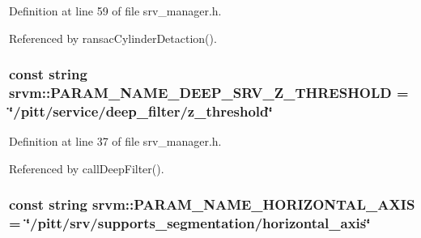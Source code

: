 Definition at line 59 of file srv\-\_\-manager.\-h.



Referenced by ransac\-Cylinder\-Detaction().

\hypertarget{namespacesrvm_af5f0c98fe811a1ad130ec625e9b2cf75}{
\subsubsection[{P\-A\-R\-A\-M\-\_\-\-N\-A\-M\-E\-\_\-\-D\-E\-E\-P\-\_\-\-S\-R\-V\-\_\-\-Z\-\_\-\-T\-H\-R\-E\-S\-H\-O\-L\-D}]{\setlength{\rightskip}{0pt plus 5cm}const string srvm\-::\-P\-A\-R\-A\-M\-\_\-\-N\-A\-M\-E\-\_\-\-D\-E\-E\-P\-\_\-\-S\-R\-V\-\_\-\-Z\-\_\-\-T\-H\-R\-E\-S\-H\-O\-L\-D = \char`\"{}/pitt/service/deep\-\_\-filter/z\-\_\-threshold\char`\"{}}}\label{namespacesrvm_af5f0c98fe811a1ad130ec625e9b2cf75}


Definition at line 37 of file srv\-\_\-manager.\-h.



Referenced by call\-Deep\-Filter().

\hypertarget{namespacesrvm_a2957bf6ee16944664364c470f1beb958}{
\subsubsection[{P\-A\-R\-A\-M\-\_\-\-N\-A\-M\-E\-\_\-\-H\-O\-R\-I\-Z\-O\-N\-T\-A\-L\-\_\-\-A\-X\-I\-S}]{\setlength{\rightskip}{0pt plus 5cm}const string srvm\-::\-P\-A\-R\-A\-M\-\_\-\-N\-A\-M\-E\-\_\-\-H\-O\-R\-I\-Z\-O\-N\-T\-A\-L\-\_\-\-A\-X\-I\-S = \char`\"{}/pitt/srv/supports\-\_\-segmentation/horizontal\-\_\-axis\char`\"{}}}\label{namespacesrvm_a2957bf6ee16944664364c470f1beb958}


